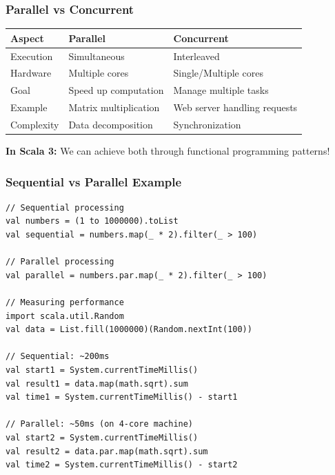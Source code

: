 \documentclass{beamer}
\begin{document}
\begin{frame}
\frametitle{Parallel vs Concurrent}

\begin{table}
\centering
\begin{tabular}{|l|l|l|}
\hline
\textbf{Aspect} & \textbf{Parallel} & \textbf{Concurrent} \\
\hline
Execution & Simultaneous & Interleaved \\
\hline
Hardware & Multiple cores & Single/Multiple cores \\
\hline
Goal & Speed up computation & Manage multiple tasks \\
\hline
Example & Matrix multiplication & Web server handling requests \\
\hline
Complexity & Data decomposition & Synchronization \\
\hline
\end{tabular}
\end{table}

\vspace{1em}
\textbf{In Scala 3:} We can achieve both through functional programming patterns!

\end{frame}

\begin{frame}[fragile]
\frametitle{Sequential vs Parallel Example}

\begin{lstlisting}[style=scalaStyle]
// Sequential processing
val numbers = (1 to 1000000).toList
val sequential = numbers.map(_ * 2).filter(_ > 100)

// Parallel processing
val parallel = numbers.par.map(_ * 2).filter(_ > 100)

// Measuring performance
import scala.util.Random
val data = List.fill(1000000)(Random.nextInt(100))

// Sequential: ~200ms
val start1 = System.currentTimeMillis()
val result1 = data.map(math.sqrt).sum
val time1 = System.currentTimeMillis() - start1

// Parallel: ~50ms (on 4-core machine)
val start2 = System.currentTimeMillis()
val result2 = data.par.map(math.sqrt).sum
val time2 = System.currentTimeMillis() - start2
\end{lstlisting}

\end{frame}
\end{document}
